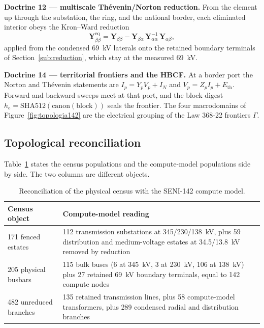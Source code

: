 \textbf{Doctrine 12 --- multiscale Th\'evenin/Norton reduction.} From the element up through the substation, the ring, and the national border, each eliminated interior obeys the Kron--Ward reduction
\begin{equation}
\mathbf{Y}_{\beta\beta}^{\mathrm{eq}} = \mathbf{Y}_{\beta\beta} - \mathbf{Y}_{\beta\alpha}\, \mathbf{Y}_{\alpha\alpha}^{-1}\, \mathbf{Y}_{\alpha\beta},
\label{eq:matrioshka}
\end{equation}
applied from the condensed 69~kV laterals onto the retained boundary terminals of Section~\ref{sub:reduction}, which stay at the measured 69~kV.

\textbf{Doctrine 14 --- territorial frontiers and the HBCF.} At a border port the Norton and Th\'evenin statements are $I_p=Y_p V_p+I_N$ and $V_p=Z_p I_p+E_{\mathrm{th}}$. Forward and backward sweeps meet at that port, and the block digest $h_e=\mathrm{SHA512}(\mathrm{canon}(\mathrm{block}))$ seals the frontier. The four macrodomains of Figure~\ref{fig:topologia142} are the electrical grouping of the Law 368-22 frontiers $\Gamma$.

\subsection{Topological reconciliation}
\label{sub:crosswalk}

Table~\ref{tab:crosswalk} states the census populations and the compute-model populations side by side. The two columns are different objects.

\begin{table}[!t]
\centering
\caption{Reconciliation of the physical census with the SENI-142 compute model.}
\label{tab:crosswalk}
\begin{tabular}{p{}p{}}
\toprule
Census object & Compute-model reading \\
\midrule
171 fenced estates & 112 transmission substations at 345/230/138~kV, plus 59 distribution and medium-voltage estates at 34.5/13.8~kV removed by reduction \\
205 physical busbars & 115 bulk buses (6 at 345~kV, 3 at 230~kV, 106 at 138~kV) plus 27 retained 69~kV boundary terminals, equal to 142 compute nodes \\
482 unreduced branches & 135 retained transmission lines, plus 58 compute-model transformers, plus 289 condensed radial and distribution branches \\
\bottomrule
\end{tabular}
\end{table}

